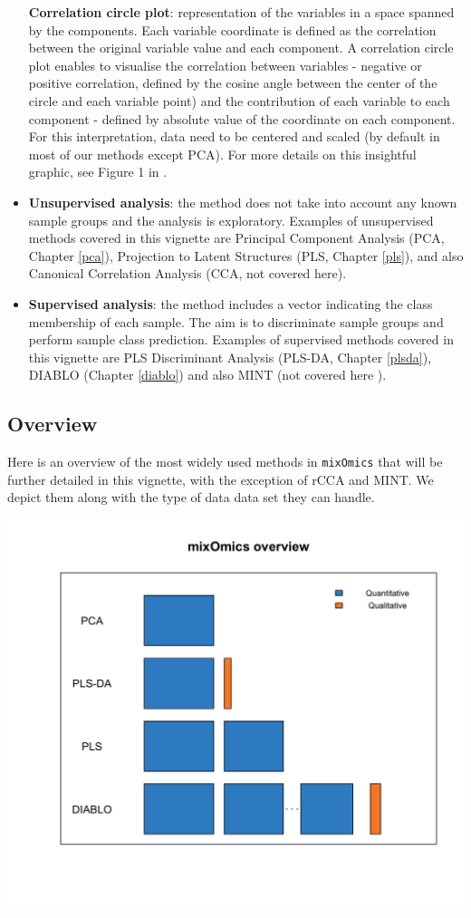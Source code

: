 \documentclass[]{book}
\theoremstyle{definition}
\theoremstyle{definition}
\theoremstyle{definition}
\theoremstyle{remark}
\begin{document}
\begin{itemize}
  \textbf{Correlation circle plot}: representation of the variables in a
  space spanned by the components. Each variable coordinate is defined
  as the correlation between the original variable value and each
  component. A correlation circle plot enables to visualise the
  correlation between variables - negative or positive correlation,
  defined by the cosine angle between the center of the circle and each
  variable point) and the contribution of each variable to each
  component - defined by absolute value of the coordinate on each
  component. For this interpretation, data need to be centered and
  scaled (by default in most of our methods except PCA). For more
  details on this insightful graphic, see Figure 1 in \citep{Gon12}.
\item
  \textbf{Unsupervised analysis}: the method does not take into account
  any known sample groups and the analysis is exploratory. Examples of
  unsupervised methods covered in this vignette are Principal Component
  Analysis (PCA, Chapter \ref{pca}), Projection to Latent Structures
  (PLS, Chapter \ref{pls}), and also Canonical Correlation Analysis
  (CCA, not covered here).
\item
  \textbf{Supervised analysis}: the method includes a vector indicating
  the class membership of each sample. The aim is to discriminate sample
  groups and perform sample class prediction. Examples of supervised
  methods covered in this vignette are PLS Discriminant Analysis
  (PLS-DA, Chapter \ref{plsda}), DIABLO (Chapter \ref{diablo}) and also
  MINT (not covered here \citep{Roh16}).
\end{itemize}

\subsection{Overview}\label{intro:overview}

Here is an overview of the most widely used methods in \texttt{mixOmics}
that will be further detailed in this vignette, with the exception of
rCCA and MINT. We depict them along with the type of data data set they
can handle.

\begin{center}\includegraphics[width=0.5\linewidth]{Figures/overview-1} \end{center}
\end{document}
